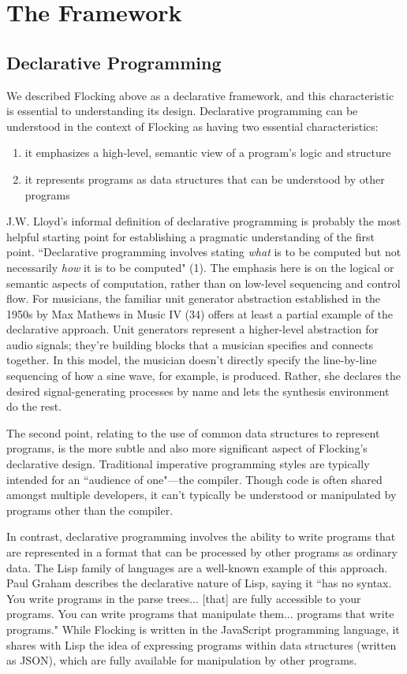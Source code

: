 \documentclass{article}
\begin{document}
\section{The Framework}

\subsection{Declarative Programming}
We described Flocking above as a declarative framework, and this characteristic is essential to understanding its design. Declarative programming can be understood in the context of Flocking as having two essential characteristics:

\begin{enumerate}
\item it emphasizes a high-level, semantic view of a program’s logic and structure
\item it represents programs as data structures that can be understood by other programs
\end{enumerate}

J.W. Lloyd's informal definition of declarative programming is probably the most helpful starting point for establishing a pragmatic understanding of the first point. ``Declarative programming involves stating {\it what} is to be computed but not necessarily {\it how} it is to be computed" (1). The emphasis here is on the logical or semantic aspects of computation, rather than on low-level sequencing and control flow. For musicians, the familiar unit generator abstraction established in the 1950s by Max Mathews in Music IV (34) offers at least a partial example of the declarative approach. Unit generators represent a higher-level abstraction for audio signals; they're building blocks that a musician specifies and connects together. In this model, the musician doesn't directly specify the line-by-line sequencing of how a sine wave, for example, is produced. Rather, she declares the desired signal-generating processes by name and lets the synthesis environment do the rest.

The second point, relating to the use of common data structures to represent programs, is the more subtle and also more significant aspect of Flocking’s declarative design. Traditional imperative programming styles are typically intended for an ``audience of one"---the compiler. Though code is often shared amongst multiple developers, it can’t typically be understood or manipulated by programs other than the compiler.

In contrast, declarative programming involves the ability to write programs that are represented in a format that can be processed by other programs as ordinary data. The Lisp family of languages are a well-known example of this approach. Paul Graham describes the declarative nature of Lisp, saying it ``has no syntax. You write programs in the parse trees... [that] are fully accessible to your programs. You can write programs that manipulate them... programs that write programs." While Flocking is written in the JavaScript programming language, it shares with Lisp the idea of expressing programs within data structures (written as JSON), which are fully available for manipulation by other programs.
\end{document}
